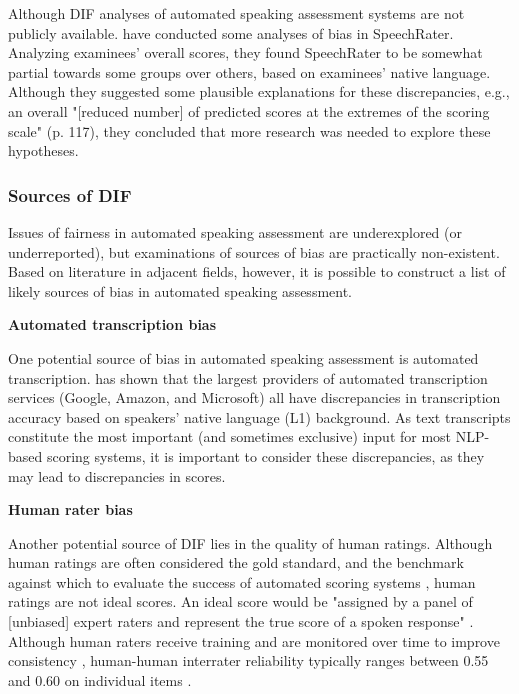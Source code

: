 \documentclass [PhD] {uclathes}
\begin{document}
Although DIF analyses of automated speaking assessment systems are not publicly available. \citet{wang2018monitoring} have conducted some analyses of bias in SpeechRater. Analyzing examinees’ overall scores, they found SpeechRater to be somewhat partial towards some groups over others, based on examinees’ native language. Although they suggested some plausible explanations for these discrepancies, e.g., an overall "[reduced number] of predicted scores at the extremes of the scoring scale" (p. 117), they concluded that more research was needed to explore these hypotheses.

\subsubsection{Sources of DIF}

Issues of fairness in automated speaking assessment are underexplored (or underreported), but examinations of sources of bias are practically non-existent. Based on literature in adjacent fields, however, it is possible to construct a list of likely sources of bias in automated speaking assessment. 

\noindent \textbf{Automated transcription bias} \;

One potential source of bias in automated speaking assessment is automated transcription. \citet{dichristofano2023} has shown that the largest providers of automated transcription services (Google, Amazon, and Microsoft) all have discrepancies in transcription accuracy based on speakers’ native language (L1) background. As text transcripts constitute the most important (and sometimes exclusive) input for most NLP-based scoring systems, it is important to consider these discrepancies, as they may lead to discrepancies in scores.

\noindent \textbf{Human rater bias} \;

Another potential source of DIF lies in the quality of human ratings. Although human ratings are often considered the gold standard, and the benchmark against which to evaluate the success of automated scoring systems \citep{zhang2019assessing}, human ratings are not ideal scores. An ideal score would be "assigned by a panel of [unbiased] expert raters and represent the true score of a spoken response" \citep{zechner2019summary}. Although human raters receive training and are monitored over time to improve consistency \citep{engelhard2002monitoring}, human-human interrater reliability typically ranges between 0.55 and 0.60 on individual items \citep{zechner2019summary}. 
\end{document}

